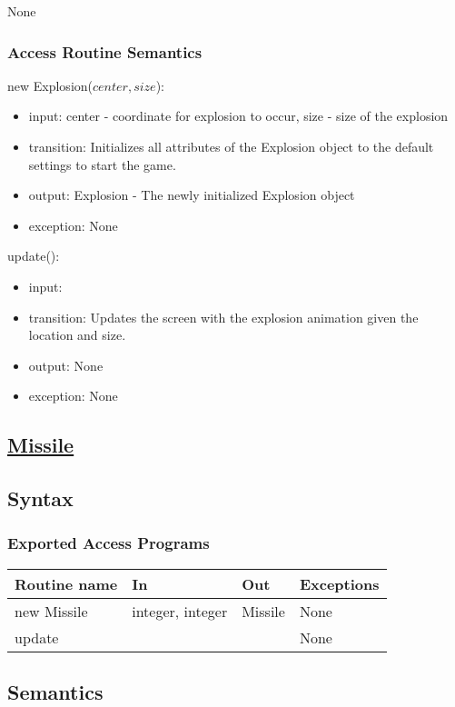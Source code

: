 \documentclass[12pt, titlepage]{article}
\begin{document}
None

\subsubsection* {Access Routine Semantics}

\noindent new Explosion($center, size$):
\begin{itemize}
\item input: center - coordinate for explosion to occur, size - size of the explosion
\item transition: Initializes all attributes of the Explosion object to the default settings to start the game.
\item output: Explosion - The newly initialized Explosion object
\item exception: None
\end{itemize}

\noindent update():
\begin{itemize}
\item input: 
\item transition: Updates the screen with the explosion animation given the location and size. 
\item output: None
\item exception: None
\end{itemize}

\subsection* {\underline{Missile}} 
\subsection* {Syntax}

\subsubsection* {Exported Access Programs}

\begin{tabular}{| l | l | l | p{5cm} |}
\hline
\textbf{Routine name} & \textbf{In} & \textbf{Out} & \textbf{Exceptions}\\
\hline
new Missile & integer, integer & Missile & None\\
\hline
update & & & None\\
\hline
\end{tabular}

\subsection* {Semantics}
\end{document}

